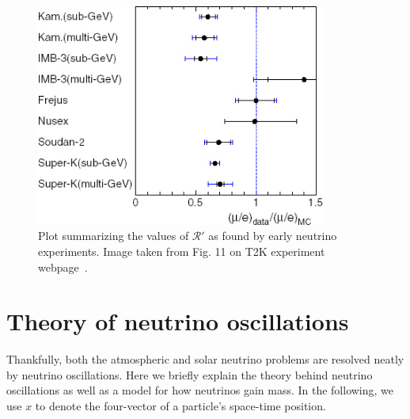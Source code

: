 \begin{figure}
  \centering
  \includegraphics[width=0.85\textwidth,height=0.25\textheight,keepaspectratio]
                {pictures/dblratio.jpg}
  \vspace*{10mm}
  \caption{Plot summarizing the values of $\mathcal{R}'$ as found by early
           neutrino experiments. Image taken from Fig. 11 on T2K experiment
           webpage~\cite{T2K}.}
  \label{fig:rprime}
\end{figure}

\section{Theory of neutrino oscillations}
Thankfully, both the atmospheric and solar neutrino problems are resolved
neatly by neutrino oscillations.
Here we briefly explain the theory behind neutrino oscillations as well as a
model for how neutrinos gain mass. In the following, we use $x$ to denote
the four-vector of a particle's space-time position.

